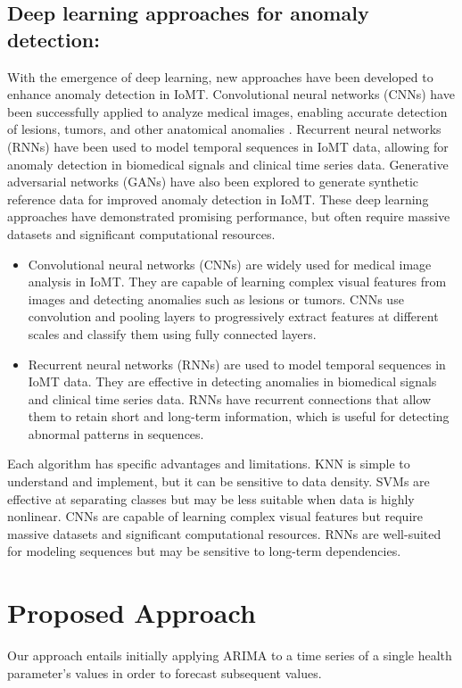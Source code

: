 \documentclass[conference]{IEEEtran}
\begin{document}
\subsection{Deep learning approaches for anomaly detection:}
With the emergence of deep learning, new approaches have been developed to enhance anomaly detection in IoMT. Convolutional neural networks (CNNs) have been successfully applied to analyze medical images, enabling accurate detection of lesions, tumors, and other anatomical anomalies\cite{b4} \cite{b5}. Recurrent neural networks (RNNs) have been used to model temporal sequences in IoMT data, allowing for anomaly detection in biomedical signals and clinical time series data\cite{b6}. Generative adversarial networks (GANs) have also been explored to generate synthetic reference data for improved anomaly detection in IoMT\cite{b7}. These deep learning approaches have demonstrated promising performance, but often require massive datasets and significant computational resources\cite{b8}.
\begin{itemize}
\item 
Convolutional neural networks (CNNs) are widely used for medical image analysis in IoMT. They are capable of learning complex visual features from images and detecting anomalies such as lesions or tumors. CNNs use convolution and pooling layers to progressively extract features at different scales and classify them using fully connected layers.
\item 

Recurrent neural networks (RNNs) are used to model temporal sequences in IoMT data. They are effective in detecting anomalies in biomedical signals and clinical time series data\cite{b9}. RNNs have recurrent connections that allow them to retain short and long-term information, which is useful for detecting abnormal patterns in sequences.

\end{itemize}

\vspace{6pt}
Each algorithm has specific advantages and limitations. KNN is simple to understand and implement, but it can be sensitive to data density. SVMs are effective at separating classes but may be less suitable when data is highly nonlinear. CNNs are capable of learning complex visual features but require massive datasets and significant computational resources. RNNs are well-suited for modeling sequences but may be sensitive to long-term dependencies.

\section{Proposed Approach}
Our approach entails initially applying ARIMA to a time series of a single health parameter's values in order to forecast subsequent values. 
\end{document}
